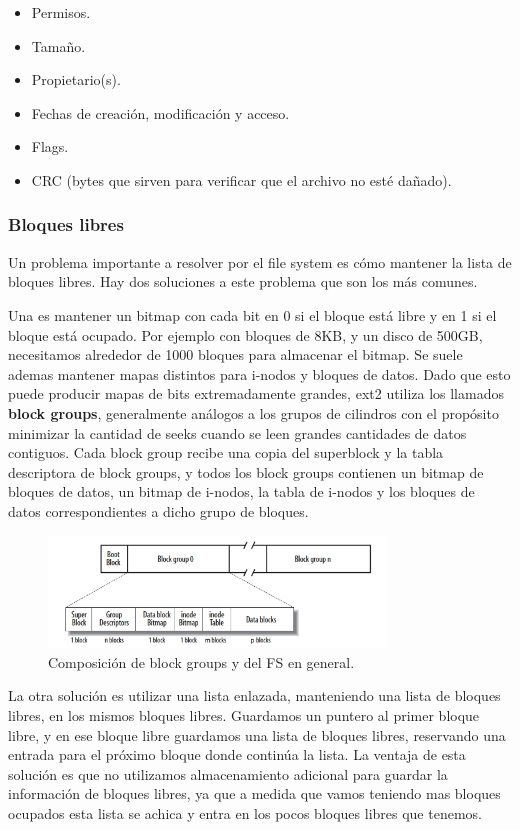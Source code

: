 \documentclass{article}
\begin{document}
\begin{itemize}
\item Permisos.
\item Tama\~no.
\item Propietario(s).
\item Fechas de creaci\'on, modificaci\'on y acceso.
\item Flags.
\item CRC (bytes que sirven para verificar que el archivo no est\'e da\~nado).
\end{itemize}

\subsubsection{Bloques libres}

Un problema importante a resolver por el file system es c\'omo mantener la lista de bloques libres. Hay dos soluciones a este problema que son los m\'as comunes. 

Una es mantener un bitmap con cada bit en 0 si el bloque est\'a libre y en 1 si el bloque est\'a ocupado. Por ejemplo con bloques de 8KB, y un disco de 500GB, necesitamos alrededor de 1000 bloques para almacenar el bitmap. Se suele ademas mantener mapas distintos para i-nodos y bloques de datos. Dado que esto puede producir mapas de bits extremadamente grandes, ext2 utiliza los llamados \textbf{block groups}, generalmente análogos a los grupos de cilindros con el propósito minimizar la cantidad de seeks cuando se leen grandes cantidades de datos contiguos. Cada block group recibe una copia del superblock y la tabla descriptora de block groups, y todos los block groups contienen un bitmap de bloques de datos, un bitmap de i-nodos, la tabla de i-nodos y los bloques de datos correspondientes a dicho grupo de bloques.

\begin{figure}[H]
    \centering
    \includegraphics[width=0.8\textwidth]{imgs/block_groups.png}
    \caption{Composición de block groups y del FS en general.}
    \label{fig:block_groups}
\end{figure}

La otra solución es utilizar una lista enlazada, manteniendo una lista de bloques libres, en los mismos bloques libres. Guardamos un puntero al primer bloque libre, y en ese bloque libre guardamos una lista de bloques libres, reservando una entrada para el pr\'oximo bloque donde contin\'ua la lista. La ventaja de esta solución es que no utilizamos almacenamiento adicional para guardar la información de bloques libres, ya que a medida que vamos teniendo mas bloques ocupados esta lista se achica y entra en los pocos bloques libres que tenemos.
\end{document}
